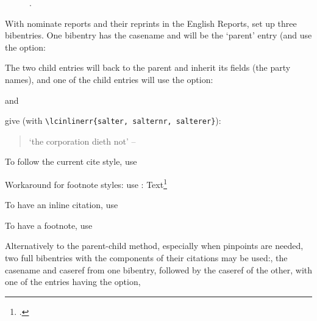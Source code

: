 \begin{figure}
\begin{center}
\toggletrue{lcimageshow}
\caption[Equity follows Law]{.}
\end{center}
\end{figure}

\p With nominate reports and their reprints in the English Reports, set up three bibentries.  One bibentry has the casename and will be the `parent' entry (and use the  option:


\begin{quotation}\noindent
{}
\end{quotation}

The two child entries will  back to the parent and inherit its fields (the party names), and one of the child entries will use the  option:

\begin{quotation}\noindent
{}
\end{quotation}

and

\begin{quotation}\noindent
{}
\end{quotation}
give (with \verb|\lcinlinerr{salter, salternr, salterer}|):
\begin{quotation}\noindent
`the corporation dieth not' -- 
\end{quotation}

\p To  follow the current cite style, use

Workaround for footnote styles: use : Text\footnote{.}

\p To have an inline citation, use


\p To have a footnote, use



\p Alternatively to the parent-child method, especially when pinpoints are needed, two full bibentries with the components of their citations may be used:, the casename and caseref from one bibentry, followed by the caseref of the other, with one of the entries having the  option,

